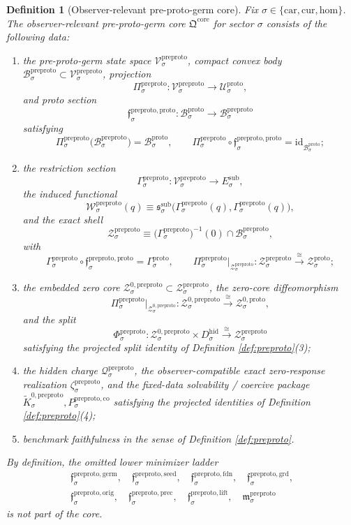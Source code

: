 \documentclass[11pt]{article}
\newcommand{\Car}{\mathrm{car}}
\newcommand{\Cur}{\mathrm{cur}}
\newcommand{\Hom}{\mathrm{hom}}
\newcommand{\SubTarget}[1]{E_{#1}^{\mathrm{sub}}}
\newcommand{\SubPair}[1]{\mathfrak s_{#1}^{\mathrm{sub}}}
\newcommand{\HiddenBody}[1]{D_{#1}^{\mathrm{hid}}}
\newcommand{\ProtoSpace}[1]{\mathcal U_{#1}^{\mathrm{proto}}}
\newcommand{\ProtoBody}[1]{\mathcal B_{#1}^{\mathrm{proto}}}
\newcommand{\ProtoSection}[1]{\Gamma_{#1}^{\mathrm{proto}}}
\newcommand{\ProtoShellSet}[1]{\mathcal Z_{#1}^{\mathrm{proto}}}
\newcommand{\ProtoZeroCore}[1]{\mathcal Z_{#1}^{0,\mathrm{proto}}}
\newcommand{\PreProtoCore}{\mathfrak Q^{\mathrm{core}}}
\newcommand{\PreProtoSpace}[1]{\mathcal V_{#1}^{\mathrm{preproto}}}
\newcommand{\PreProtoBody}[1]{\mathcal B_{#1}^{\mathrm{preproto}}}
\newcommand{\PreProtoProj}[1]{\Pi_{#1}^{\mathrm{preproto}}}
\newcommand{\PreProtoProtoMin}[1]{\mathfrak f_{#1}^{\mathrm{preproto,proto}}}
\newcommand{\PreProtoGermMin}[1]{\mathfrak f_{#1}^{\mathrm{preproto,germ}}}
\newcommand{\PreProtoSeedMin}[1]{\mathfrak f_{#1}^{\mathrm{preproto,seed}}}
\newcommand{\PreProtoFoundMin}[1]{\mathfrak f_{#1}^{\mathrm{preproto,fdn}}}
\newcommand{\PreProtoGroundMin}[1]{\mathfrak f_{#1}^{\mathrm{preproto,grd}}}
\newcommand{\PreProtoOrigMin}[1]{\mathfrak f_{#1}^{\mathrm{preproto,orig}}}
\newcommand{\PreProtoPrecMin}[1]{\mathfrak f_{#1}^{\mathrm{preproto,prec}}}
\newcommand{\PreProtoLiftMin}[1]{\mathfrak f_{#1}^{\mathrm{preproto,lift}}}
\newcommand{\PreProtoSubMin}[1]{\mathfrak m_{#1}^{\mathrm{preproto}}}
\newcommand{\PreProtoSection}[1]{\Gamma_{#1}^{\mathrm{preproto}}}
\newcommand{\PreProtoFunctional}[1]{\mathscr W_{#1}^{\mathrm{preproto}}}
\newcommand{\PreProtoShellSet}[1]{\mathcal Z_{#1}^{\mathrm{preproto}}}
\newcommand{\PreProtoZeroCore}[1]{\mathcal Z_{#1}^{0,\mathrm{preproto}}}
\newcommand{\PreProtoSplit}[1]{\Phi_{#1}^{\mathrm{preproto}}}
\newcommand{\PreProtoCharge}[1]{\mathcal Q_{#1}^{\mathrm{preproto}}}
\newcommand{\PreProtoEmbed}[1]{\zeta_{#1}^{\mathrm{preproto}}}
\newcommand{\PreProtoKernelCh}[1]{\widetilde K_{#1}^{0,\mathrm{preproto}}}
\newcommand{\PreProtoStateComp}[1]{P_{#1}^{\mathrm{preproto,co}}}
\newtheorem{definition}{Definition}
\begin{document}
\begin{definition}[Observer-relevant pre-proto-germ core]
\label{def:core}
Fix \(\sigma\in\{\Car,\Cur,\Hom\}\). The \emph{observer-relevant pre-proto-germ core} \(\PreProtoCore\) for sector \(\sigma\) consists of the following data:
\begin{enumerate}
    \item the pre-proto-germ state space \(\PreProtoSpace{\sigma}\), compact convex body \(\PreProtoBody{\sigma}\subset\PreProtoSpace{\sigma}\), projection
    \[
    \PreProtoProj{\sigma}:\PreProtoSpace{\sigma}\to\ProtoSpace{\sigma},
    \]
    and proto section
    \[
    \PreProtoProtoMin{\sigma}:\ProtoBody{\sigma}\to\PreProtoBody{\sigma}
    \]
    satisfying
    \[
    \PreProtoProj{\sigma}\bigl(\PreProtoBody{\sigma}\bigr)=\ProtoBody{\sigma},
    \qquad
    \PreProtoProj{\sigma}\circ\PreProtoProtoMin{\sigma}
    =
    \mathrm{id}_{\ProtoBody{\sigma}};
    \]
    \item the restriction section
    \[
    \PreProtoSection{\sigma}:\PreProtoSpace{\sigma}\to\SubTarget{\sigma},
    \]
    the induced functional
    \[
    \PreProtoFunctional{\sigma}(q)
    \equiv
    \SubPair{\sigma}\bigl(\PreProtoSection{\sigma}(q),\PreProtoSection{\sigma}(q)\bigr),
    \]
    and the exact shell
    \[
    \PreProtoShellSet{\sigma}
    \equiv
    \bigl(\PreProtoSection{\sigma}\bigr)^{-1}(0)\cap\PreProtoBody{\sigma},
    \]
    with
    \[
    \PreProtoSection{\sigma}\circ\PreProtoProtoMin{\sigma}
    =
    \ProtoSection{\sigma},
    \qquad
    \PreProtoProj{\sigma}\big|_{\PreProtoShellSet{\sigma}}
    :
    \PreProtoShellSet{\sigma}
    \xrightarrow{\cong}
    \ProtoShellSet{\sigma};
    \]
    \item the embedded zero core \(\PreProtoZeroCore{\sigma}\subset\PreProtoShellSet{\sigma}\), the zero-core diffeomorphism
    \[
    \PreProtoProj{\sigma}\big|_{\PreProtoZeroCore{\sigma}}
    :
    \PreProtoZeroCore{\sigma}
    \xrightarrow{\cong}
    \ProtoZeroCore{\sigma},
    \]
    and the split
    \[
    \PreProtoSplit{\sigma}:
    \PreProtoZeroCore{\sigma}\times\HiddenBody{\sigma}
    \xrightarrow{\cong}
    \PreProtoShellSet{\sigma}
    \]
    satisfying the projected split identity of Definition \ref{def:preproto}(3);
    \item the hidden charge \(\PreProtoCharge{\sigma}\), the observer-compatible exact zero-response realization \(\PreProtoEmbed{\sigma}\), and the fixed-data solvability / coercive package \(\PreProtoKernelCh{\sigma},\PreProtoStateComp{\sigma}\) satisfying the projected identities of Definition \ref{def:preproto}(4);
    \item benchmark faithfulness in the sense of Definition \ref{def:preproto}.
\end{enumerate}
By definition, the omitted lower minimizer ladder
\[
\begin{aligned}
\PreProtoGermMin{\sigma},\quad
\PreProtoSeedMin{\sigma},\quad
\PreProtoFoundMin{\sigma},\quad
\PreProtoGroundMin{\sigma},\\
\PreProtoOrigMin{\sigma},\quad
\PreProtoPrecMin{\sigma},\quad
\PreProtoLiftMin{\sigma},\quad
\PreProtoSubMin{\sigma}
\end{aligned}
\]
is \emph{not} part of the core.
\end{definition}
\end{document}
